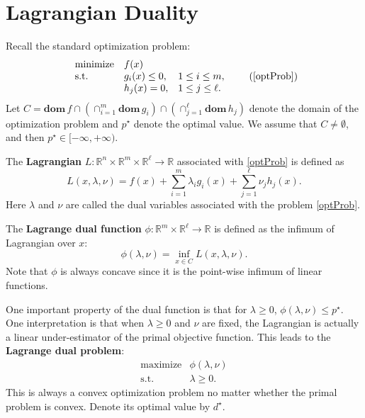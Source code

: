 \documentclass[openany]{book}
\theoremstyle{definition}
\theoremstyle{remark}
\begin{document}
\section{Lagrangian Duality}
Recall the standard optimization problem:
\begin{equation}
\begin{array}{lll}
\mathrm{minimize} & f(x) & \\
\mathrm{s.t.} & g_i(x)\le0, & 1\le i\le m, \\
 & h_j(x)=0, & 1\le j\le \ell.
\end{array}
\tag{\ref{optProb}}
\end{equation}
Let $C=\mathbf{dom}\,f\cap(\cap_{i=1}^m\mathbf{dom}\,g_i)\cap(\cap_{j=1}^{\ell}\mathbf{dom}\,h_j)$ denote the domain of the optimization problem and $p^{\star}$ denote the optimal value. We assume that $C\ne\emptyset$, and then $p^{\star}\in[-\infty,+\infty)$.

The \textbf{Lagrangian} $L:\mathbb{R}^n\times\mathbb{R}^m\times\mathbb{R}^{\ell}\rightarrow\mathbb{R}$ associated with \eqref{optProb} is defined as
\begin{equation}\label{lag}
L(x,\lambda,\nu)=f(x)+\sum_{i=1}^m\lambda_ig_i(x)+\sum_{j=1}^{\ell}\nu_jh_j(x).
\end{equation}
Here $\lambda$ and $\nu$ are called the dual variables associated with the problem \eqref{optProb}.

The \textbf{Lagrange dual function} $\phi:\mathbb{R}^m\times\mathbb{R}^{\ell}\rightarrow\mathbb{R}$ is defined as the infimum of Lagrangian over $x$:
\begin{equation}\label{lagDual}
\phi(\lambda,\nu)=\inf_{x\in C}L(x,\lambda,\nu).
\end{equation}
Note that $\phi$ is always concave since it is the point-wise infimum of linear functions.

One important property of the dual function is that for $\lambda\ge0$, $\phi(\lambda,\nu)\le p^{\star}$. One interpretation is that when $\lambda\ge0$ and $\nu$ are fixed, the Lagrangian is actually a linear under-estimator of the primal objective function. This leads to the \textbf{Lagrange dual problem}:
\begin{equation}\label{dualP}
\begin{array}{ll}
\mathrm{maximize} & \phi(\lambda,\nu) \\
\mathrm{s.t.} & \lambda\ge0.
\end{array}
\end{equation}
This is always a convex optimization problem no matter whether the primal problem is convex. Denote its optimal value by $d^{\star}$.
\end{document}
